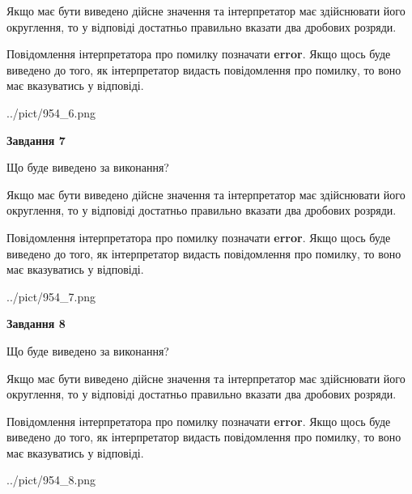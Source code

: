 \documentclass[12pt, ukrainian]{article}
\begin{document}
{\begin {Large}
Якщо має бути виведено дійсне значення та інтерпретатор має здійснювати його округлення, 
то у відповіді достатньо правильно вказати два дробових розряди.

Повідомлення інтерпретатора про помилку позначати \textbf{error}.
Якщо щось буде виведено до того, як інтерпретатор видасть повідомлення про помилку, 
то воно має вказуватись у відповіді. \par

\begin{center}
	{../pict/954_6.png}
\end{center}
\newpage

{\begin {center}\textbf{Завдання 7}\end {center}}\par
Що буде виведено за виконання? \par

Якщо має бути виведено дійсне значення та інтерпретатор має здійснювати його округлення, 
то у відповіді достатньо правильно вказати два дробових розряди.

Повідомлення інтерпретатора про помилку позначати \textbf{error}.
Якщо щось буде виведено до того, як інтерпретатор видасть повідомлення про помилку, 
то воно має вказуватись у відповіді. \par

\begin{center}
	{../pict/954_7.png}
\end{center}
\newpage

{\begin {center}\textbf{Завдання 8}\end {center}}\par
Що буде виведено за виконання? \par

Якщо має бути виведено дійсне значення та інтерпретатор має здійснювати його округлення, 
то у відповіді достатньо правильно вказати два дробових розряди.

Повідомлення інтерпретатора про помилку позначати \textbf{error}.
Якщо щось буде виведено до того, як інтерпретатор видасть повідомлення про помилку, 
то воно має вказуватись у відповіді. \par

\begin{center}
	{../pict/954_8.png}
\end{center}
\newpage


\end{Large}}
\end{document}
